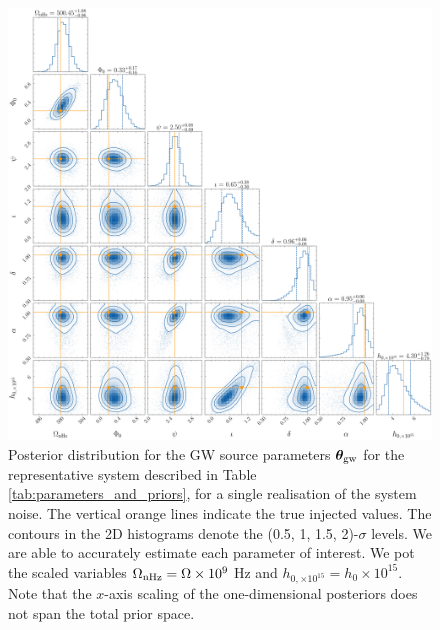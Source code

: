 \documentclass[fleqn,usenatbib,useAMS]{mnras}
\begin{document}
 
\begin{figure}
	\includegraphics[width=\textwidth, height =\textwidth ]{images/small_h_posterior_10}
	\caption{Posterior distribution for the GW source parameters $\boldsymbol{\theta}_{\rm gw}$ for the representative system described in Table \ref{tab:parameters_and_priors}, for a single realisation of the system noise. The vertical orange lines indicate the true injected values. The contours in the 2D histograms denote the (0.5, 1, 1.5, 2)-$\sigma$ levels. We are able to accurately estimate each parameter of interest. We pot the scaled variables $\Omega_{\rm nHz} = \Omega \times 10^{9}$ Hz and $h_{0, \times 10^{15}} = h_0 \times 10^{15}$. Note that the $x$-axis scaling of the one-dimensional posteriors does not span the total prior space.}
	\label{fig:corner_plot_1}
\end{figure}

\end{document}
